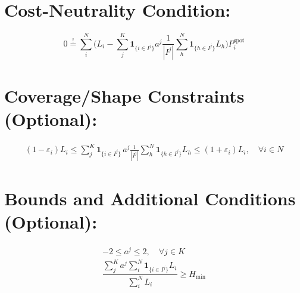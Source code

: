 \documentclass[11pt,leqno]{article}
\begin{document}

\section*{Cost-Neutrality Condition:}
\[
0 \mathrel{\stackrel{!}{=}} \sum_{i}^{N}
\Bigg(
  L_i
  - \sum_{j}^{K} \mathbf{1}_{\{i \in I^{j}\}} a^{j}
    \frac{1}{|I^{j}|}
    \sum_{h}^{N} \mathbf{1}_{\{h \in I^{j}\}} L_h
\Bigg)
P_i^{\text{spot}}
\]


\section*{Coverage/Shape Constraints (Optional):}
\begin{align*}
  (1-\varepsilon_i)L_i \le \sum_{j}^{K} \mathbf{1}_{\{i \in I^{j}\}} \, a^{j} \frac{1}{|I^{j}|}
  \sum_{h}^{N} \mathbf{1}_{\{h \in I^{j}\}} L_h \le (1+\varepsilon_i)L_i,
  \quad \forall i \in N
\end{align*}

\section*{Bounds and Additional Conditions (Optional):}
\begin{gather*}
-2 \le a^{j} \le 2, \quad \forall j \in K \\[0.8em]
\dfrac{\sum\limits_{j}^{K} a^{j} \sum\limits_{i}^{N} \mathbf{1}_{\{i \in I^{j}\}} L_i}{\sum\limits_{i}^{N} L_i} \ge H_{\min}
\end{gather*}
\end{document}
